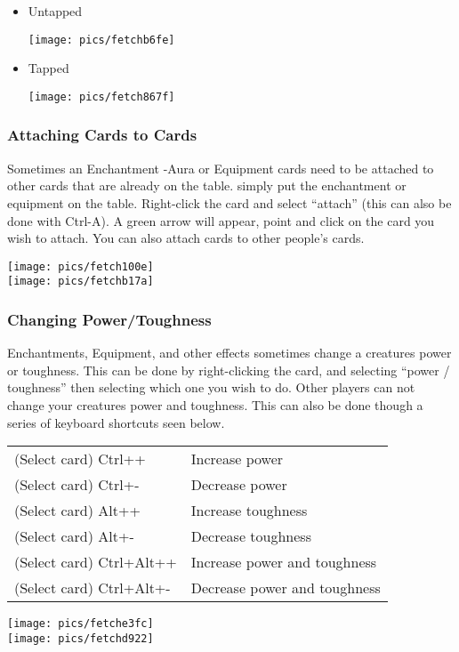 \documentclass[a4paper]{scrbook}
\begin{document}
\begin{itemize}
 \item Untapped
 \begin{center}
  \texttt{[image: pics/fetchb6fe]}
 \end{center}

 \item Tapped
 \begin{center}
  \texttt{[image: pics/fetch867f]}
 \end{center}
\end{itemize}

\subsubsection{Attaching Cards to Cards}
Sometimes an Enchantment -Aura or Equipment cards need to be attached to other cards that are already on the table. simply put the enchantment or equipment on the table. Right-click the card and select “attach” (this can also be done with Ctrl-A). A green arrow will appear, point and click on the card you wish to attach. You can also attach cards to other people's cards.
\begin{center}
 \texttt{[image: pics/fetch100e]}\\
 \texttt{[image: pics/fetchb17a]}
\end{center}


\subsubsection{Changing Power/Toughness}
Enchantments, Equipment, and other effects sometimes change a creatures power or toughness. This can be done by right-clicking the card, and selecting “power / toughness” then selecting which one you wish to do. Other players can not change your creatures power and toughness. This can also be done though a series of keyboard shortcuts seen below.

\begin{center}
\begin{tabular}{ll}
(Select card) Ctrl++ & Increase power \\
(Select card) Ctrl+- & Decrease power \\
(Select card) Alt++ & Increase toughness \\
(Select card) Alt+- & Decrease toughness \\
(Select card) Ctrl+Alt++ & Increase power and toughness \\
(Select card) Ctrl+Alt+- & Decrease power and toughness
\end{tabular}
\texttt{[image: pics/fetche3fc]}\\
\texttt{[image: pics/fetchd922]}
\end{center}
\end{document}
